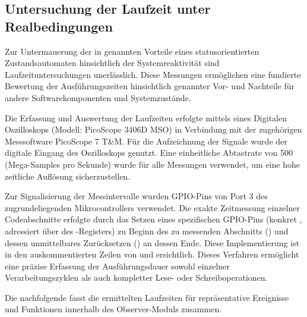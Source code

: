 
\subsection{Untersuchung der Laufzeit unter Realbedingungen}
\label{sec:laufzeit}

Zur Untermauerung der in  genannten Vorteile eines statusorientierten Zustandsautomaten hinsichtlich der Systemreaktivit\"at sind Laufzeituntersuchungen unerl\"asslich. Diese Messungen erm\"oglichen eine fundierte Bewertung der Ausf\"uhrungszeiten hinsichtlich genannter Vor- und Nachteile f\"ur andere Softwarekomponenten und Systemzust\"ande.

Die Erfassung und Auswertung der Laufzeiten erfolgte mittels eines Digitalen Oszilloskops (Modell: PicoScope 3406D MSO) in Verbindung mit der zugeh\"origen Messsoftware PicoScope 7 T\&M. F\"ur die Aufzeichnung der Signale wurde der digitale Eingang  des Oszilloskops genutzt. Eine einheitliche Abtastrate von 500  (Mega-Samples pro Sekunde) wurde f\"ur alle Messungen verwendet, um eine hohe zeitliche Aufl\"osung sicherzustellen.

Zur Signalisierung der Messintervalle wurden GPIO-Pins von Port 3 des zugrundeliegenden Mikrocontrollers verwendet. Die exakte Zeitmessung einzelner Codeabschnitte erfolgte durch das Setzen eines spezifischen GPIO-Pins (konkret , adressiert \"uber  des -Registers) zu Beginn des zu messenden Abschnitts () und dessen unmittelbares Zur\"ucksetzen () an dessen Ende. Diese Implementierung ist in den auskommentierten Zeilen von  und  ersichtlich. Dieses Verfahren erm\"oglicht eine pr\"azise Erfassung der Ausf\"uhrungsdauer sowohl einzelner Verarbeitungszyklen als auch kompletter Lese- oder Schreiboperationen.

\newpage
Die nachfolgende  fasst die ermittelten Laufzeiten f\"ur repr\"asentative Ereignisse und Funktionen innerhalb des Observer-Moduls zusammen.

